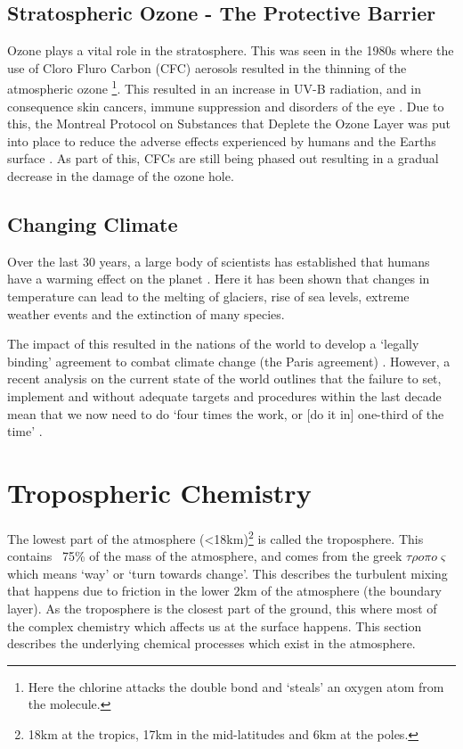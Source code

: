\subsection{Stratospheric Ozone - The Protective Barrier}\label{sec:ozonerole}
Ozone plays a vital role in the stratosphere. This was seen in the 1980s where the use of Cloro Fluro Carbon (CFC) aerosols resulted in the thinning of the atmospheric ozone \citep{ozonehole}\footnote{Here the chlorine attacks the double bond and `steals' an oxygen atom from the  molecule.}. This resulted in an increase in UV-B radiation, and in consequence skin cancers, immune suppression and disorders of the eye \citep{o3damage}. Due to this, the Montreal Protocol on Substances that Deplete the Ozone Layer was put into place to reduce the adverse effects experienced by humans and the Earths surface \citep{montreal}. As part of this, CFCs are still being phased out resulting in a gradual decrease in the damage of the ozone hole.


\subsection{Changing Climate} \label{sec:climatechange}
Over the last 30 years, a large body of scientists has established that humans have a warming effect on the planet \citep{IPCC1990Science,IPCC1995Science,IPCC2007Science,IPCC2013Science,ipbes}. Here it has been shown that changes in temperature can lead to the melting of glaciers, rise of sea levels, extreme weather events and the extinction of many species.

The impact of this resulted in the nations of the world to develop a `legally binding' agreement to combat climate change (the Paris agreement) \citep{paris1,paris}. However, a recent analysis on the current state of the world outlines that the failure to set, implement and without adequate targets and procedures within the last decade mean that we now need to do `four times the work, or [do it in] one-third of the time' \citep{failparis}.



\section{Tropospheric Chemistry}

The lowest part of the atmosphere (<18km)\footnote{18km at the tropics, 17km in the mid-latitudes and 6km at the poles. } is called the troposphere. This contains ~75\% of the mass of the atmosphere, and comes from the greek $\tau\rho o \pi o \varsigma$ which means `way' or `turn towards change'. This describes the turbulent mixing that happens due to friction in the lower 2km of the atmosphere (the boundary layer). As the troposphere is the closest part of the ground, this where most of the complex chemistry which affects us at the surface happens. This section describes the underlying chemical processes which exist in the atmosphere.




